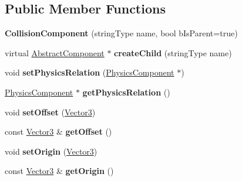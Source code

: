 \subsection*{Public Member Functions}
\begin{DoxyCompactItemize}
\item 
\hypertarget{classCollisionComponent_afb4c94b74df07d369a7bab70d77f72bc}{{\bfseries Collision\-Component} (string\-Type name, bool b\-Is\-Parent=true)}\label{classCollisionComponent_afb4c94b74df07d369a7bab70d77f72bc}

\item 
\hypertarget{classCollisionComponent_aa0eb62779095cda61ec7b3c66b8b7c0a}{virtual \hyperlink{classAbstractComponent}{Abstract\-Component} $\ast$ {\bfseries create\-Child} (string\-Type name)}\label{classCollisionComponent_aa0eb62779095cda61ec7b3c66b8b7c0a}

\item 
\hypertarget{classCollisionComponent_a716a5007c7998b6adb8f5e72e61af8a0}{void {\bfseries set\-Physics\-Relation} (\hyperlink{classPhysicsComponent}{Physics\-Component} $\ast$)}\label{classCollisionComponent_a716a5007c7998b6adb8f5e72e61af8a0}

\item 
\hypertarget{classCollisionComponent_a955114529427d0689e2a66f8b74cab35}{\hyperlink{classPhysicsComponent}{Physics\-Component} $\ast$ {\bfseries get\-Physics\-Relation} ()}\label{classCollisionComponent_a955114529427d0689e2a66f8b74cab35}

\item 
\hypertarget{classCollisionComponent_a4729528e6019cb9c5ea4cd1332b648e1}{void {\bfseries set\-Offset} (\hyperlink{classVector3}{Vector3})}\label{classCollisionComponent_a4729528e6019cb9c5ea4cd1332b648e1}

\item 
\hypertarget{classCollisionComponent_a1d372343d43e1e12574b59a4ab5433fa}{const \hyperlink{classVector3}{Vector3} \& {\bfseries get\-Offset} ()}\label{classCollisionComponent_a1d372343d43e1e12574b59a4ab5433fa}

\item 
\hypertarget{classCollisionComponent_a5f56052f2904e3cde9bff46f89b7b43c}{void {\bfseries set\-Origin} (\hyperlink{classVector3}{Vector3})}\label{classCollisionComponent_a5f56052f2904e3cde9bff46f89b7b43c}

\item 
\hypertarget{classCollisionComponent_aae935f9a6da2f22d3b60e39f8a437312}{const \hyperlink{classVector3}{Vector3} \& {\bfseries get\-Origin} ()}\label{classCollisionComponent_aae935f9a6da2f22d3b60e39f8a437312}


\end{DoxyCompactItemize}
